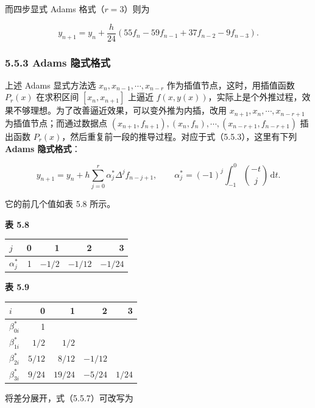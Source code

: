 而四步显式 Adams 格式（\(r=3\)）则为

\[
y_{n+1}=y_n+\frac h{24}(55f_n-59f_{n-1}+37f_{n-2}-9f_{n-3}).
\tag{5.5.6}
\]

\subsubsection{5.5.3 Adams 隐式格式}\label{ch05b-adams-ux9690ux5f0fux683cux5f0f}

上述 Adams 显式方法选 \(x_n,x_{n-1},\cdots,x_{n-r}\) 作为插值节点，这时，用插值函数 \(P_r(x)\) 在求积区间 \([x_n,x_{n+1}]\) 上逼近 \(f(x,y(x))\)，实际上是个外推过程，效果不够理想。为了改善逼近效果，可以变外推为内插，改用 \(x_{n+1},x_n,\cdots,x_{n-r+1}\) 为插值节点；而通过数据点 \((x_{n+1},\allowbreak f_{n+1}),\allowbreak (x_n,\allowbreak f_n),\allowbreak \cdots,\allowbreak (x_{n-r+1},\allowbreak f_{n-r+1})\) 插出函数 \(P_r(x)\)，然后重复前一段的推导过程。对应于式（5.5.3），这里有下列 \textbf{Adams 隐式格式}：

\[
y_{n+1}=y_n+h\sum_{j=0}^r\alpha_j^*\Delta^j f_{n-j+1},\qquad
\alpha_j^*=(-1)^j\int_{-1}^0\binom{-t}{j}\,\mathrm dt.
\tag{5.5.7}
\]

它的前几个值如表 5.8 所示。

\textbf{表 5.8}

{\def\LTcaptype{none} %
\begin{longtable}[]{@{}lrrrr@{}}
\toprule\noalign{}
\(j\) & 0 & 1 & 2 & 3 \\
\midrule\noalign{}
\endhead
\bottomrule\noalign{}
\endlastfoot
\(\alpha_j^*\) & 1 & \(-1/2\) & \(-1/12\) & \(-1/24\) \\
\end{longtable}
}

\textbf{表 5.9}

{\def\LTcaptype{none} %
\begin{longtable}[]{@{}lrrrr@{}}
\toprule\noalign{}
\(i\) & 0 & 1 & 2 & 3 \\
\midrule\noalign{}
\endhead
\bottomrule\noalign{}
\endlastfoot
\(\beta_{0i}^*\) & 1 & & & \\
\(\beta_{1i}^*\) & \(1/2\) & \(1/2\) & & \\
\(\beta_{2i}^*\) & \(5/12\) & \(8/12\) & \(-1/12\) & \\
\(\beta_{3i}^*\) & \(9/24\) & \(19/24\) & \(-5/24\) & \(1/24\) \\
\end{longtable}
}

将差分展开，式（5.5.7）可改写为

